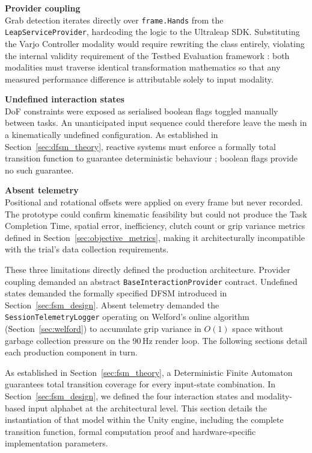 \textbf{Provider coupling} \\
Grab detection iterates directly over \texttt{frame.Hands} from the \texttt{LeapServiceProvider}, hardcoding the logic to the Ultraleap SDK. Substituting the Varjo Controller modality would require rewriting the class entirely, violating the internal validity requirement of the Testbed Evaluation framework \citep{Bowman2001TestbedTechniques}: both modalities must traverse identical transformation mathematics so that any measured performance difference is attributable solely to input modality.

\textbf{Undefined interaction states} \\
DoF constraints were exposed as serialised boolean flags toggled manually between tasks. An unanticipated input sequence could therefore leave the mesh in a kinematically undefined configuration. As established in Section~\ref{sec:dfsm_theory}, reactive systems must enforce a formally total transition function to guarantee deterministic behaviour \citep{Sipser2012IntroductionComputation}; boolean flags provide no such guarantee.

\textbf{Absent telemetry} \\ %
Positional and rotational offsets were applied on every frame but never recorded. The prototype could confirm kinematic feasibility but could not produce the Task Completion Time, spatial error, inefficiency, clutch count or grip variance metrics defined in Section~\ref{sec:objective_metrics}, making it architecturally incompatible with the trial's data collection requirements.

These three limitations directly defined the production architecture. Provider coupling demanded an abstract \texttt{BaseInteractionProvider} contract. Undefined states demanded the formally specified DFSM introduced in Section~\ref{sec:fsm_design}. Absent telemetry demanded the \texttt{SessionTelemetryLogger} operating on Welford's online algorithm (Section~\ref{sec:welford}) to accumulate grip variance in $O(1)$ space without garbage collection pressure on the 90\,Hz render loop. The following sections detail each production component in turn.

As established in Section~\ref{sec:fsm_theory}, a Deterministic Finite Automaton guarantees total transition coverage for every input-state combination. In Section~\ref{sec:fsm_design}, we defined the four interaction states and modality-based input alphabet at the architectural level. This section details the instantiation of that model within the Unity engine, including the complete transition function, formal computation proof and hardware-specific implementation parameters.


